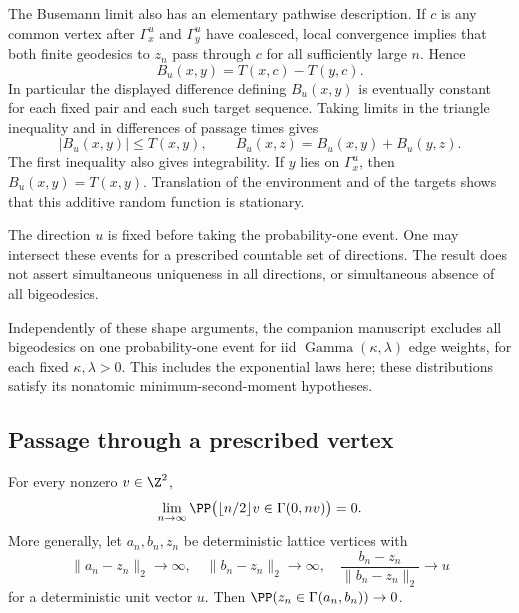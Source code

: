 The Busemann limit also has an elementary pathwise description. If $c$
is any common vertex after $\Gamma_x^u$ and $\Gamma_y^u$ have coalesced,
local convergence implies that both finite geodesics to $z_n$ pass
through $c$ for all sufficiently large $n$. Hence
\begin{equation}\label{eq:busemann-common-vertex}
 B_u(x,y)=T(x,c)-T(y,c).
\end{equation}
In particular the displayed difference defining $B_u(x,y)$ is eventually
constant for each fixed pair and each such target sequence. Taking limits
in the triangle inequality and in differences of passage times gives
\[
 |B_u(x,y)|\leq T(x,y),\qquad
 B_u(x,z)=B_u(x,y)+B_u(y,z).
\]
The first inequality also gives integrability. If $y$ lies on
$\Gamma_x^u$, then $B_u(x,y)=T(x,y)$. Translation of the environment and
of the targets shows that this additive random function is stationary.

The direction $u$ is fixed before taking the probability-one event.
One may intersect these events for a prescribed countable set of
directions. The result does not assert simultaneous uniqueness in all
directions, or simultaneous absence of all bigeodesics.

Independently of these shape arguments, the companion manuscript
\cite[Theorem~1.1]{OpenAINoBigeodesics2026} excludes all bigeodesics on one
probability-one event for iid $\operatorname{Gamma}(\kappa,\lambda)$ edge
weights, for each fixed $\kappa,\lambda>0$. This includes the exponential
laws here; these distributions satisfy its nonatomic minimum-second-moment
hypotheses.

\subsection{Passage through a prescribed vertex}

\begin{corollary}\label{cor:midpoint}
For every nonzero $v\in\Z^2$,
\[
 \lim_{n\to\infty}
 \PP\bigl(\lfloor n/2\rfloor v\in\Gamma(0,nv)\bigr)=0.
\]
More generally, let $a_n,b_n,z_n$ be deterministic lattice vertices with
\[
 \lVert a_n-z_n\rVert_2\to\infty,
 \quad\lVert b_n-z_n\rVert_2\to\infty,
 \quad
 \frac{b_n-z_n}{\lVert b_n-z_n\rVert_2}\longrightarrow u
\]
for a deterministic unit vector $u$. Then
$\PP(z_n\in\Gamma(a_n,b_n))\to0$.
\end{corollary}

